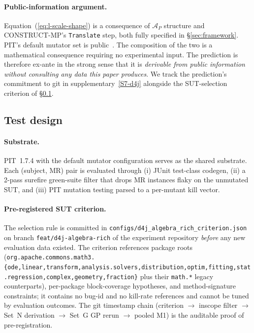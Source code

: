 \paragraph{Public-information argument.}
Equation~(\ref{eq:l-scale-shape}) is a consequence of $\mathcal{A}_P$
structure and CONSTRUCT-MP's \texttt{Translate} step, both fully
specified in \S\ref{sec:framework}. PIT's default mutator set is
public~\cite{Coles2016PIT}. The composition of the two is a
mathematical consequence requiring no experimental input. The
prediction is therefore ex-ante in the strong sense that it is
\emph{derivable from public information without consulting any data
this paper produces}. We track the prediction's commitment to
git in supplementary~\ref{S7-d4j} alongside the SUT-selection
criterion of \S\ref{subsec:test-design}.

\subsection{Test design}
\label{subsec:test-design}

\paragraph{Substrate.}
PIT~1.7.4 with the default mutator configuration serves as the
shared substrate. Each (subject, MR) pair is evaluated through (i)
JUnit test-class codegen, (ii) a 2-pass surefire green-suite filter
that drops MR instances flaky on the unmutated SUT, and (iii) PIT
mutation testing parsed to a per-mutant kill vector.

\paragraph{Pre-registered SUT criterion.}
The selection rule is committed in
\texttt{configs/d4j\_algebra\_rich\_criterion.json} on branch
\texttt{feat/d4j-algebra-rich} of the experiment repository
\emph{before} any new evaluation data existed. The criterion
references package roots
(\texttt{org.apache.commons.math3.\{ode,linear,transform,analysis.solvers,distribution,optim,fitting,stat.regression,complex,geometry,fraction\}}
plus their \texttt{math.*} legacy counterparts), per-package
block-coverage hypotheses, and method-signature constraints; it
contains no bug-id and no kill-rate references and cannot be tuned by
evaluation outcomes. The git timestamp chain (criterion
$\rightarrow$ inscope filter $\rightarrow$ Set~N derivation
$\rightarrow$ Set~G GP rerun $\rightarrow$ pooled M1) is the
auditable proof of pre-registration.

